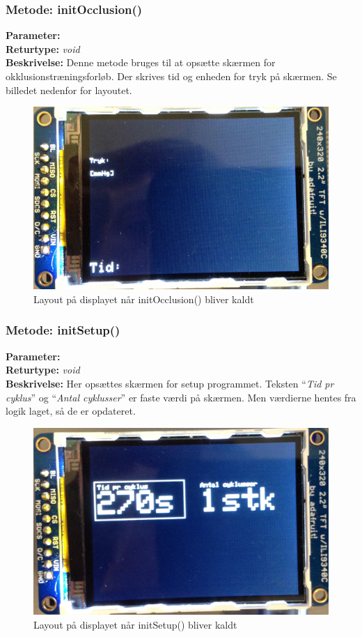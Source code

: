 \subsubsection{Metode: initOcclusion()}
\textbf{Parameter: }
\\ \textbf{Returtype: } \textit{void}
\\ \textbf{Beskrivelse: }  Denne metode bruges til at opsætte skærmen for okklusionstræningsforløb. Der skrives tid og enheden for tryk på skærmen. Se billedet nedenfor for layoutet. 

\begin{figure}[H]
	\includegraphics[width=\textwidth]{billeder/occlusion.png}
	\caption{Layout på displayet når initOcclusion() bliver kaldt}\label{pic:occlusion}
\end{figure}

\subsubsection{Metode: initSetup()}
\textbf{Parameter: } 
\\ \textbf{Returtype: } \textit{void}
\\ \textbf{Beskrivelse: } Her opsættes skærmen for setup programmet. Teksten “\textit{Tid pr cyklus}” og “\textit{Antal cyklusser}” er faste værdi på skærmen. Men værdierne hentes fra logik laget, så de er opdateret. 

\begin{figure}[H]
	\includegraphics[width=\textwidth]{billeder/setup.png}
	\caption{Layout på displayet når initSetup() bliver kaldt}\label{pic:setup}
\end{figure}

